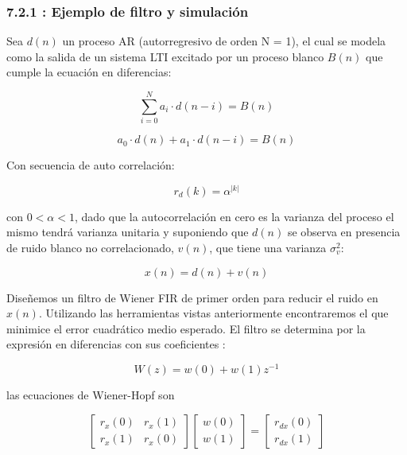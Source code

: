 \documentclass[a4paper]{article}
\begin{document}
 \subsubsection*{7.2.1 : Ejemplo de filtro y simulación}
 
 
 Sea $d(n)$ un proceso $\mathrm{AR}$ (autorregresivo de orden N = 1), el cual se modela como la salida de un sistema LTI excitado por un proceso blanco $B(n)$ que cumple la ecuación en diferencias:
 
 \begin{equation}
 	 \sum_{i = 0 }^{N} a_i \cdot d(n-i) =  B(n)
 \end{equation}
 
 
  \begin{equation}
 	  a_0 \cdot d(n) + a_1 \cdot d(n-i) =  B(n)
 \end{equation}
 
 
 
 Con secuencia de auto correlación:
 
 \begin{equation}
 	r_d(k) = \alpha^{|k|}
 \end{equation}



 con $0 < \alpha < 1$, dado que la autocorrelación en cero es la varianza del proceso el mismo tendrá varianza unitaria y suponiendo que $d(n)$ se observa en presencia de ruido blanco no correlacionado, $v(n)$, que tiene una varianza $\sigma_v^2$:
 
 \begin{equation}
 	x(n) = d(n) + v(n)
 \end{equation}
 
 Diseñemos un filtro de Wiener FIR de primer orden para reducir el ruido en $x(n)$. Utilizando las herramientas vistas anteriormente encontraremos el que minimice el error cuadrático medio esperado. El filtro se determina por la expresión en diferencias con sus coeficientes : 
 
 \begin{equation}
 	W(z) = w(0) + w(1)z^{-1}
 \end{equation}
 
 las ecuaciones de Wiener-Hopf son
 
 \begin{equation}
 	\begin{bmatrix}
 		r_x(0) & r_x(1) \\
 		r_x(1) & r_x(0)
 	\end{bmatrix}
 	\begin{bmatrix}
 		w(0) \\
 		w(1)
 	\end{bmatrix}
 	=
 	\begin{bmatrix}
 		r_{dx}(0) \\
 		r_{dx}(1)
 	\end{bmatrix}
 \end{equation}
 
\end{document}
